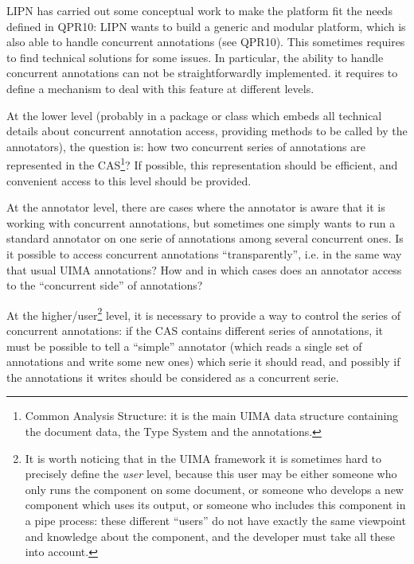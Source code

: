 LIPN has carried out some conceptual work to make the platform fit the needs defined in QPR10: LIPN wants to build a generic and modular platform, which is also able to handle concurrent annotations (see QPR10). This sometimes requires to find technical solutions for some issues. In particular, the ability to handle concurrent annotations can not be straightforwardly implemented. it requires to define a mechanism to deal with this feature at different levels.

At the lower level (probably in a package or class which embeds all technical details about concurrent annotation access, providing methods to be called by the annotators), the question is: how two concurrent series of annotations are represented in the CAS\footnote{Common Analysis Structure: it is the main UIMA data structure containing the document data, the Type System and the annotations.}? If possible, this representation should be efficient, and convenient access to this level should be provided.

At the annotator level, there are cases where the annotator is aware that it is working with concurrent annotations, but sometimes one simply wants to run a standard annotator on one serie of annotations among several concurrent ones. Is it possible to access concurrent annotations ``transparently'', i.e. in the same way that usual UIMA annotations? How and in which cases does an annotator access to the ``concurrent side'' of annotations?

At the higher/user\footnote{It is worth noticing that in the UIMA framework it is sometimes hard to precisely define the {\em user} level, because this user may be either someone who only runs the component on some document, or someone who develops a new component which uses its output, or someone who includes this component in a pipe process: these different ``users'' do not have exactly the same viewpoint and knowledge about the component, and the developer must take all these into account.} level, it is necessary to provide a way to control the series of concurrent annotations: if the CAS contains different series of annotations,  it must be possible to tell a ``simple'' annotator (which reads a single set of annotations and write some new ones) which serie it should read, and possibly if the annotations it writes should be considered as a concurrent serie.


